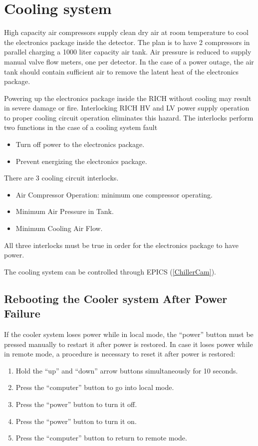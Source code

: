\documentclass[12pt]{article}
\begin{document}
{\color{blue}
   \section{Cooling system}
}
High capacity air compressors supply clean dry air at room temperature to cool the electronics package inside the detector. The plan is to have 2 compressors in parallel charging a 1000 liter capacity air tank. Air pressure is reduced to supply manual valve flow meters, one per detector. In the case of a power outage, the air tank should contain sufficient air to remove the latent heat of the electronics package.

Powering up the electronics package inside the RICH without cooling may result in severe damage or fire. Interlocking RICH HV and LV power supply operation to proper cooling circuit operation eliminates this hazard.
The interlocks perform two functions in the case of a cooling system fault
\begin{itemize}
\item Turn off power to the electronics package.
\item  Prevent energizing the electronics package.
\end{itemize}
There are 3 cooling circuit interlocks.
\begin{itemize}
\item Air Compressor Operation: minimum one compressor operating.
\item Minimum Air Pressure in Tank.  
\item Minimum Cooling Air Flow.
\end{itemize}
All three interlocks must be true in order for the electronics package to have power.

   The cooling system can be controlled through EPICS (\ref{ChillerCam}). 

     \subsection{Rebooting the Cooler system After Power Failure}

     If the cooler system  loses power while in local mode, the ``power'' button must be pressed manually to restart it after power is restored.  In case it loses power while in remote mode, a procedure is necessary to reset it after power is restored:
   {\footnotesize
     \begin{enumerate}
         \item Hold the ``up'' and ``down'' arrow buttons simultaneously for 10 seconds.
         \item Press the ``computer'' button to go into local mode.
         \item Press the ``power'' button to turn it off.
         \item Press the ``power'' button to turn it on.
         \item Press the ``computer'' button to return to remote mode.
    \end{enumerate}
    }
\end{document}
